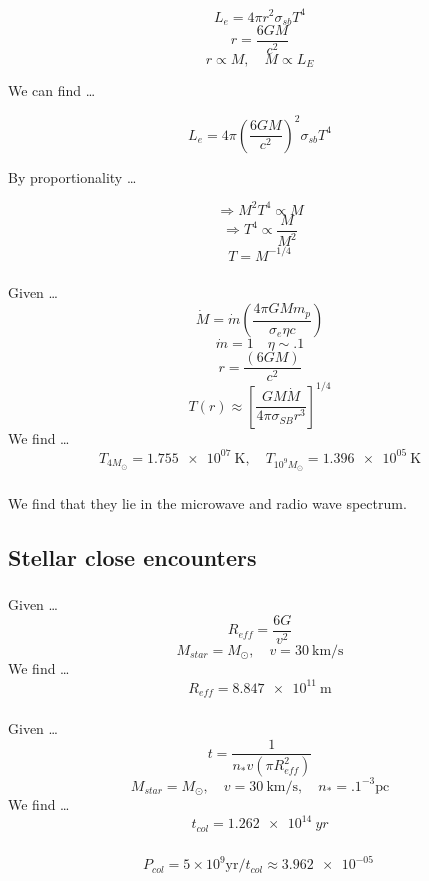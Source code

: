 \documentclass{article}
\begin{document}
\[L_e = 4\pi r^2 \sigma_{sb} T^4\]
\[r = \frac{6GM}{c^2}\]
\[r \propto M, \quad M \propto L_E \]

We can find \dots

\[L_e = 4\pi \left(\frac{6GM}{c^2}\right)^2 \sigma_{sb} T^4\]
\begin{center}
  By proportionality \dots
\end{center}
\[\Rightarrow M^2 T^4 \propto M\]
\[\Rightarrow T^4 \propto \frac{M}{M^2}\]
\[\boxed{T = M^{-1/4}}\]

\subsubsection{}
Given \dots 
\[\dot{M} = \dot{m} \left(\frac{4 \pi GMm_p}{\sigma_e \eta c }\right)\]
\[\dot{m} = 1 \quad \eta \sim .1  \]
\[r = \frac{(6GM)}{c^2}\]
\[T(r) \approx \left[\frac{GM\dot{M}}{4\pi\sigma_{SB}r^3}\right]^{1/4}\]
We find \dots 
\[\boxed{T_{4M_\odot} = \SI{1.755e+07}{\kelvin}, \quad T_{10^9M_\odot} = \SI{1.396e+05}{\kelvin}}\]

\subsubsection{}
We find that they lie in the microwave and radio wave spectrum.


\subsection{Stellar close encounters}

\subsubsection{}
Given \dots
\[R_{eff} = \frac{6G}{v^2} \]
\[M_{star} = M_\odot, \quad v = \SI{30}{\km/\s} \]
We find \dots 
\[\boxed{R_{eff} = \SI{8.847e+11}{\m}}\]

\subsubsection{}
Given \dots 
\[t = \frac{1}{n_* v (\pi R^2_{eff})}\]
\[M_{star} = M_\odot, \quad v = \SI{30}{\km/\s}, \quad n_* = .1 ^{-3}\text{pc} \]
We find \dots 
\[t_{col} = \SI{1.262e+14}{yr}\]


\subsubsection{}
\[P_{col} = 5 \times 10^9\text{yr} / t_{col} \approx \SI{ 3.962e-05 }{}\]
\end{document}
